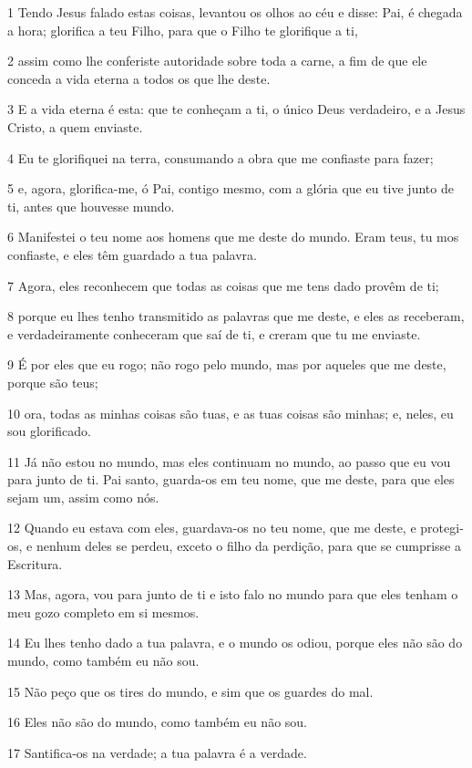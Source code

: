 \par 1 Tendo Jesus falado estas coisas, levantou os olhos ao céu e disse: Pai, é chegada a hora; glorifica a teu Filho, para que o Filho te glorifique a ti,
\par 2 assim como lhe conferiste autoridade sobre toda a carne, a fim de que ele conceda a vida eterna a todos os que lhe deste.
\par 3 E a vida eterna é esta: que te conheçam a ti, o único Deus verdadeiro, e a Jesus Cristo, a quem enviaste.
\par 4 Eu te glorifiquei na terra, consumando a obra que me confiaste para fazer;
\par 5 e, agora, glorifica-me, ó Pai, contigo mesmo, com a glória que eu tive junto de ti, antes que houvesse mundo.
\par 6 Manifestei o teu nome aos homens que me deste do mundo. Eram teus, tu mos confiaste, e eles têm guardado a tua palavra.
\par 7 Agora, eles reconhecem que todas as coisas que me tens dado provêm de ti;
\par 8 porque eu lhes tenho transmitido as palavras que me deste, e eles as receberam, e verdadeiramente conheceram que saí de ti, e creram que tu me enviaste.
\par 9 É por eles que eu rogo; não rogo pelo mundo, mas por aqueles que me deste, porque são teus;
\par 10 ora, todas as minhas coisas são tuas, e as tuas coisas são minhas; e, neles, eu sou glorificado.
\par 11 Já não estou no mundo, mas eles continuam no mundo, ao passo que eu vou para junto de ti. Pai santo, guarda-os em teu nome, que me deste, para que eles sejam um, assim como nós.
\par 12 Quando eu estava com eles, guardava-os no teu nome, que me deste, e protegi-os, e nenhum deles se perdeu, exceto o filho da perdição, para que se cumprisse a Escritura.
\par 13 Mas, agora, vou para junto de ti e isto falo no mundo para que eles tenham o meu gozo completo em si mesmos.
\par 14 Eu lhes tenho dado a tua palavra, e o mundo os odiou, porque eles não são do mundo, como também eu não sou.
\par 15 Não peço que os tires do mundo, e sim que os guardes do mal.
\par 16 Eles não são do mundo, como também eu não sou.
\par 17 Santifica-os na verdade; a tua palavra é a verdade.
